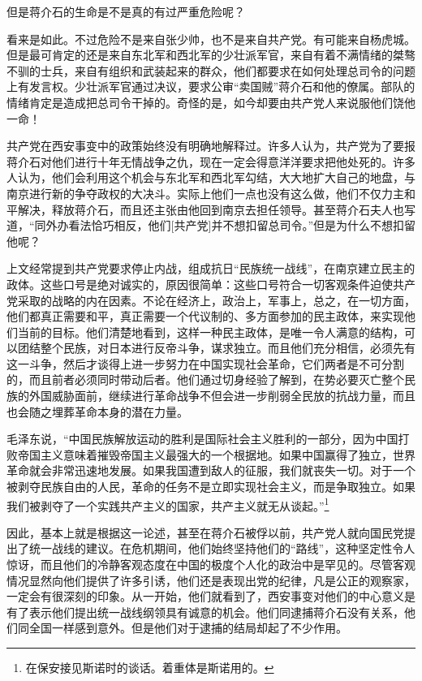 \documentclass[10pt]{book}
\begin{document}
但是蒋介石的生命是不是真的有过严重危险呢？

看来是如此。不过危险不是来自张少帅，也不是来自共产党。有可能来自杨虎城。但是最可肯定的还是来自东北军和西北军的少壮派军官，来自有着不满情绪的桀骜不驯的士兵，来自有组织和武装起来的群众，他们都要求在如何处理总司令的问题上有发言权。少壮派军官通过决议，要求公审“卖国贼”蒋介石和他的僚属。部队的情绪肯定是造成把总司令干掉的。奇怪的是，如今却要由共产党人来说服他们饶他一命！

共产党在西安事变中的政策始终没有明确地解释过。许多人认为，共产党为了要报蒋介石对他们进行十年无情战争之仇，现在一定会得意洋洋要求把他处死的。许多人认为，他们会利用这个机会与东北军和西北军勾结，大大地扩大自己的地盘，与南京进行新的争夺政权的大决斗。实际上他们一点也没有这么做，他们不仅力主和平解决，释放蒋介石，而且还主张由他回到南京去担任领导。甚至蒋介石夫人也写道，“同外办看法恰巧相反，他们[共产党]并不想扣留总司令。”但是为什么不想扣留他呢？

上文经常提到共产党要求停止内战，组成抗日“民族统一战线”，在南京建立民主的政体。这些口号是绝对诚实的，原因很简单：这些口号符合一切客观条件迫使共产党采取的战略的内在因素。不论在经济上，政治上，军事上，总之，在一切方面，他们都真正需要和平，真正需要一个代议制的、多方面参加的民主政体，来实现他们当前的目标。他们清楚地看到，这样一种民主政体，是唯一令人满意的结构，可以团结整个民族，对日本进行反帝斗争，谋求独立。而且他们充分相信，必须先有这一斗争，然后才谈得上进一步努力在中国实现社会革命，它们两者是不可分割的，而且前者必须同时带动后者。他们通过切身经验了解到，在势必要灭亡整个民族的外国威胁面前，继续进行革命战争不但会进一步削弱全民放的抗战力量，而且也会随之埋葬革命本身的潜在力量。

毛泽东说，“中国民族解放运动的胜利是国际社会主义胜利的一部分，因为中国打败帝国主义意味着摧毁帝国主义最强大的一个根据地。如果中国赢得了独立，世界革命就会非常迅速地发展。如果我国遭到敌人的征服，我们就丧失一切。对于一个被剥夺民族自由的人民，革命的任务不是立即实现社会主义，而是争取独立。如果我们被剥夺了一个实践共产主义的国家，共产主义就无从谈起。”\footnote{在保安接见斯诺时的谈话。着重体是斯诺用的。}

因此，基本上就是根据这一论述，甚至在蒋介石被俘以前，共产党人就向国民党提出了统一战线的建议。在危机期间，他们始终坚持他们的“路线”，这种坚定性令人惊讶，而且他们的冷静客观态度在中国的极度个人化的政治中是罕见的。尽管客观情况显然向他们提供了许多引诱，他们还是表现出党的纪律，凡是公正的观察家，一定会有很深刻的印象。从一开始，他们就看到了，西安事变对他们的中心意义是有了表示他们提出统一战线纲领具有诚意的机会。他们同逮捕蒋介石没有关系，他们同全国一样感到意外。但是他们对于逮捕的结局却起了不少作用。
\end{document}
